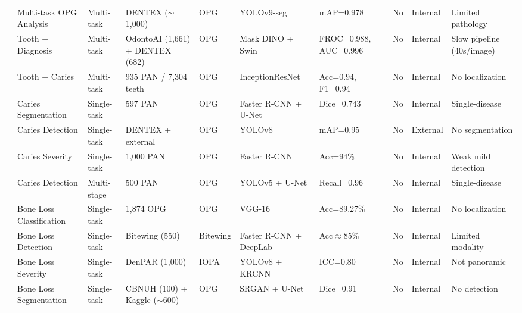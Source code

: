 \documentclass[conference]{IEEEtran}
\begin{document}
\begin{table}[t]
\begin{tabular}{p{0.5cm} p{2.0cm} p{1.3cm} p{2.2cm} p{1.1cm} p{2.4cm} p{1.6cm} p{0.6cm} p{1.3cm} p{2.2cm}}
\cite{nassiri2025yolo}           & Multi-task OPG Analysis      & Multi-task  & DENTEX ($\sim$1,000)            & OPG      & YOLOv9-seg              & mAP=0.978        & No      & Internal & Limited pathology \\
\cite{vannistelrooij2024combining}& Tooth + Diagnosis            & Multi-task  & OdontoAI (1,661) + DENTEX (682) & OPG      & Mask DINO + Swin        & FROC=0.988, AUC=0.996 & No & Internal & Slow pipeline (40s/image) \\
\cite{zancan2025ai}              & Tooth + Caries               & Multi-task  & 935 PAN / 7,304 teeth           & OPG      & InceptionResNet         & Acc=0.94, F1=0.94 & No      & Internal & No localization \\
\cite{lim2024dual}               & Caries Segmentation          & Single-task & 597 PAN                         & OPG      & Faster R-CNN + U-Net    & Dice=0.743       & No      & Internal & Single-disease \\
\cite{bizjak2024advancing}       & Caries Detection             & Single-task & DENTEX + external               & OPG      & YOLOv8                  & mAP=0.95         & No      & External & No segmentation \\
\cite{asadi2024detection}        & Caries Severity              & Single-task & 1,000 PAN                       & OPG      & Faster R-CNN            & Acc=94\%         & No      & Internal & Weak mild detection \\
\cite{pornprasertsuk2025clinical}& Caries Detection             & Multi-stage & 500 PAN                         & OPG      & YOLOv5 + U-Net          & Recall=0.96      & No      & Internal & Single-disease \\
\cite{mathur2025comparative}     & Bone Loss Classification     & Single-task & 1,874 OPG                       & OPG      & VGG-16                  & Acc=89.27\%      & No      & Internal & No localization \\
\cite{lee2025evaluation}         & Bone Loss Detection          & Single-task & Bitewing (550)                  & Bitewing & Faster R-CNN + DeepLab  & Acc$\approx$85\% & No      & Internal & Limited modality \\
\cite{wimalasiri2025ai}          & Bone Loss Severity           & Single-task & DenPAR (1,000)                  & IOPA     & YOLOv8 + KRCNN          & ICC=0.80         & No      & Internal & Not panoramic \\
\cite{kong2024integrating}       & Bone Loss Segmentation       & Single-task & CBNUH (100) + Kaggle ($\sim$600)& OPG      & SRGAN + U-Net           & Dice=0.91        & No      & Internal & No detection \\

\end{tabular}
\end{table}
\end{document}
